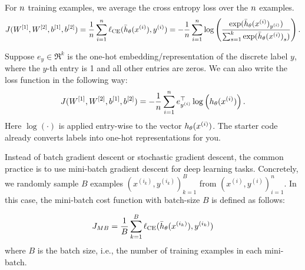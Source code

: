 For ${n}$ training examples, we average the cross entropy loss over the ${n}$ examples.
  \begin{equation*}
  J(W^{[1]},W^{[2]},b^{[1]},b^{[2]}) = \frac{1}{{n}}\sum_{i=1}^{n} \ell_\textup{CE}(\bar{h}_{\theta}(x^{(i)}),y^{(i)})  = - \frac{1}{{n}}\sum_{i=1}^{n} \log\left(\frac{\exp(\bar{h}_{\theta}(x^{(i)})_{y^{(i)}})}{\sum_{s=1}^{k}\exp({\bar{h}_{\theta}(x^{(i)})}_s)}\right).
  \end{equation*}

Suppose $e_y\in \Re^k$ is the one-hot embedding/representation of the discrete label $y$, where the $y$-th entry is 1 and all other entries are zeros. We can also write the loss function in the following way:
  \begin{equation*}
  J(W^{[1]},W^{[2]},b^{[1]},b^{[2]}) = - \frac{1}{{n}}\sum_{i=1}^{n} e_{y^{(i)}}^\top\log\left(h_\theta(x^{(i)})\right).
  \end{equation*}
Here $\log(\cdot)$ is applied entry-wise to the vector $h_\theta(x^{(i)})$. The starter code already converts labels into one-hot representations for you.


Instead of batch gradient descent or stochastic gradient descent, the common practice
is to use mini-batch gradient descent for deep learning tasks. Concretely, we randomly sample $B$ examples $(x^{(i_k)}, y^{(i_k)})_{k=1}^B$ from $(x^{(i)}, y^{(i)})_{i=1}^n$. In this case, the
mini-batch cost function with batch-size $B$ is defined as follows:

  \begin{equation*}
  J_{MB} = \frac{1}{B}\sum_{k=1}^B \ell_\textup{CE}(\bar{h}_{\theta}(x^{(i_k)}),y^{(i_k)})
  \end{equation*}
where $B$ is the batch size, i.e., the number of training examples in each mini-batch. 

\begin{enumerate}
  

\ifnum{} {
  
} \fi

  

\ifnum{} {
  
} \fi

  

\ifnum{} {
  
} \fi


  
\ifnum{} {
  
} \fi

 \end{enumerate}

